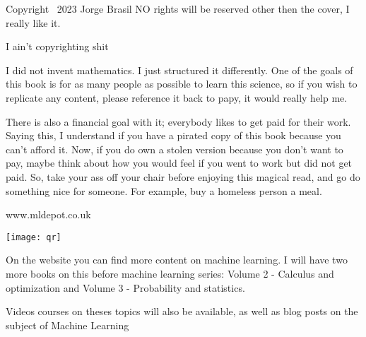 \documentclass[600paper, 11pt,twoside,openany]{kdp}
\begin{document}
\newpage
\clearpage

\vspace*{\fill}
\thispagestyle{plain}

Copyright \textcopyright\ 2023 Jorge Brasil NO rights will be reserved other then the cover, I really like it.
\par 
\vspace{-3pt}
\indent I ain't copyrighting shit
\par 
\vspace{-3pt}
\indent I did not invent mathematics. I just structured it differently. One of the goals of this book is for as many people as possible to learn this science, so if you wish to replicate any content, please reference it back to papy, it would really help me. 
\par 
\vspace{-3pt}
\indent There is also a financial goal with it; everybody likes to get paid for their work. Saying this, I understand if you have a pirated copy of this book because you can't afford it. Now, if you do own a stolen version because you don't want to pay, maybe think about how you would feel if you went to work but did not get paid. So, take your ass off your chair before enjoying this magical read, and go do something nice for someone. For example, buy a homeless person a
meal.
\par 
\vspace{-3pt}
\begin{minipage}{0.5\textwidth}\raggedleft
www.mldepot.co.uk
\end{minipage}
\begin{minipage}{0.8\textwidth}
\texttt{[image: qr]}
\end{minipage}


\par 
\vspace{-3pt}
\indent On the website you can find more content on machine learning. I will have two more books on this before  machine learning series: Volume 2 - Calculus and optimization and Volume 3 - Probability and statistics.
\par 
\vspace{-3pt}
\indent Videos courses on theses topics will also be available, as well as blog posts on the subject of Machine Learning 


{\pagestyle{plain}
\tableofcontents}
\end{document}
